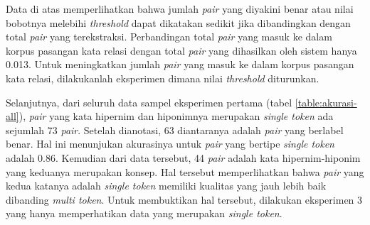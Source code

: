 Data di atas memperlihatkan bahwa jumlah \textit{pair} yang diyakini benar atau nilai bobotnya melebihi \textit{threshold} dapat dikatakan sedikit jika dibandingkan dengan total \textit{pair} yang terekstraksi. Perbandingan total \textit{pair} yang masuk ke dalam korpus pasangan kata relasi dengan total \textit{pair} yang dihasilkan oleh sistem hanya 0.013. Untuk meningkatkan jumlah \textit{pair} yang masuk ke dalam korpus pasangan kata relasi, dilakukanlah eksperimen dimana nilai \textit{threshold} diturunkan.

Selanjutnya, dari seluruh data sampel eksperimen pertama (tabel \ref{table:akurasi-all}), \textit{pair} yang kata hipernim dan hiponimnya merupakan \textit{single token} ada sejumlah 73 \textit{pair}. Setelah dianotasi, 63 diantaranya adalah \textit{pair} yang berlabel benar. Hal ini menunjukan akurasinya untuk \textit{pair} yang bertipe \textit{single token} adalah 0.86. Kemudian dari data tersebut, 44 \textit{pair} adalah kata hipernim-hiponim yang keduanya merupakan konsep. Hal tersebut memperlihatkan bahwa \textit{pair} yang kedua katanya adalah \textit{single token} memiliki kualitas yang jauh lebih baik dibanding \textit{multi token}. Untuk membuktikan hal tersebut, dilakukan eksperimen 3 yang hanya memperhatikan data yang merupakan \textit{single token}.


